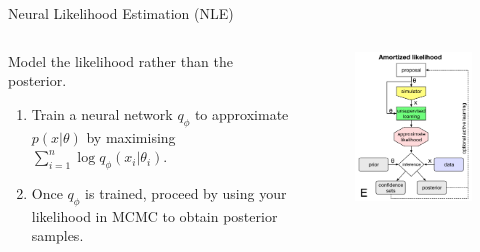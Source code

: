\documentclass[12pt, aspectratio=169]{beamer}
\let\olditem\item
\renewcommand\item{\olditem\justifying}
\begin{document}
\begin{frame}{Neural Likelihood Estimation (NLE)}
    \begin{columns}
        \begin{column}{0.5\textwidth}
            Model the likelihood rather than the posterior.
    
            \begin{enumerate}[<+->]
                \item Train a neural network $q_\phi$ to approximate $p(x|\theta)$ by maximising $\sum_{i=1}^n \log q_\phi(x_i | \theta_i)$.
        
                
                \item Once $q_\phi$ is trained, proceed by using your likelihood in MCMC to obtain posterior samples.
                
            \end{enumerate}
            \parencite{papamakarios_sequential_2019}
        \end{column}

        \begin{column}{0.5\textwidth}
            \begin{figure}
                \centering
                \includegraphics[height=0.6\textheight]{"images/SNLE.png"}
                \caption{\cite{cranmer_frontier_2020}}
            \end{figure}
        \end{column}
    \end{columns}

\end{frame}
\end{document}
